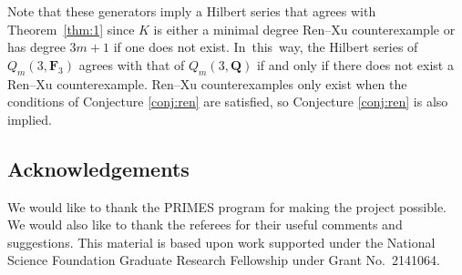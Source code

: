 \documentclass[pdftex]{sigma}
\theoremstyle{definition}
\numberwithin{equation}{section}
\begin{document}
 Note that these generators imply a Hilbert series that agrees with Theorem~\ref{thm:1} since $K$ is either a minimal degree Ren--Xu counterexample or has degree $3m+1$ if one does not exist. In~this~way, the Hilbert series of $Q_m(3,\mathbf{F}_3)$ agrees with that of $Q_m(3,\mathbf{Q})$ if and only if there does not exist a Ren--Xu counterexample. Ren--Xu counterexamples only exist when the conditions of Conjecture \ref{conj:ren} are satisfied, so Conjecture \ref{conj:ren} is also implied.


\subsection*{Acknowledgements}

We would like to thank the PRIMES program for making the project possible. We would also like to thank the referees for their useful comments and suggestions. This material is based upon work supported under the National Science Foundation Graduate Research Fellowship under Grant No.~2141064.
\end{document}
